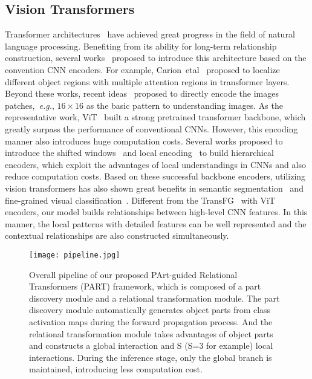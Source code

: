 \documentclass[journal]{IEEEtran}
\def\eg{{\em e.g.}}
\begin{document}
\subsection{Vision Transformers} Transformer architectures~\cite{vaswani2017attention,choromanski2020rethinking} have achieved great progress in the field of natural language processing. Benefiting from its ability for long-term relationship construction, several works~\cite{carion2020end,zhu2020deformable} proposed to introduce this architecture based on the convention CNN encoders.
For example, Carion~etal~\cite{carion2020end} proposed to localize different object regions with multiple attention regions in transformer layers. Beyond these works, recent ideas~\cite{dosovitskiy2020image,liu2021swin,yuan2021tokens,srinivas2021bottleneck} proposed to directly encode the images patches,~\eg, $16\times 16$ as the basic pattern to understanding images. As the representative work, ViT~\cite{dosovitskiy2020image} built a strong pretrained transformer backbone, which greatly surpass the performance of conventional CNNs. However, this encoding manner also introduces huge computation costs. Several works proposed to introduce the shifted windows~\cite{liu2021swin} and local encoding~\cite{yuan2021tokens} to build hierarchical encoders, which exploit the advantages of local understandings in CNNs and also reduce computation costs. Based on these successful backbone encoders, utilizing vision transformers has also shown great benefits in semantic segmentation~\cite{xie2021segformer} and fine-grained visual classification~\cite{he2021transfg}.
Different from the TransFG~\cite{he2021transfg} with ViT~\cite{dosovitskiy2020image} encoders, our model builds relationships between high-level CNN features. In this manner, the local patterns with detailed features can be well represented and the contextual relationships are also constructed simultaneously.



\begin{figure*}[!t]
\begin{center}
\texttt{[image: pipeline.jpg]}
 \caption{Overall pipeline of our proposed PArt-guided Relational Transformers (PART) framework, which is composed of a part discovery module and a relational transformation module. The part discovery module automatically generates object parts from class activation maps during the forward propagation process. And the relational transformation module takes advantages of object parts and constructs a global interaction and S (S=3 for example) local interactions. During the inference stage, only the global branch is maintained, introducing less computation cost.}
 \label{fig:pipeline}
 \end{center}
\end{figure*}
\end{document}
